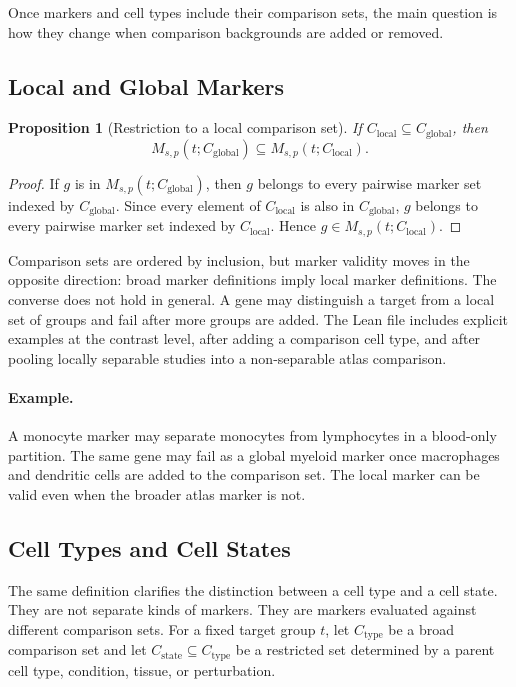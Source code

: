 \documentclass{article}
\newtheorem{proposition}{Proposition}
\begin{document}
Once markers and cell types include their comparison sets, the main question is how they change when comparison backgrounds are added or removed.

\subsection{Local and Global Markers}

\begin{proposition}[Restriction to a local comparison set]\label{prop:comparison-family-monotonicity}
If $C_{\mathrm{local}}\subseteq C_{\mathrm{global}}$, then
\[
  M_{s,p}(t;C_{\mathrm{global}})
  \subseteq
  M_{s,p}(t;C_{\mathrm{local}}).
\]
\end{proposition}

\begin{proof}
If $g$ is in $M_{s,p}(t;C_{\mathrm{global}})$, then $g$ belongs to every pairwise marker set indexed by $C_{\mathrm{global}}$. Since every element of $C_{\mathrm{local}}$ is also in $C_{\mathrm{global}}$, $g$ belongs to every pairwise marker set indexed by $C_{\mathrm{local}}$. Hence $g\in M_{s,p}(t;C_{\mathrm{local}})$.
\end{proof}

Comparison sets are ordered by inclusion, but marker validity moves in the opposite direction: broad marker definitions imply local marker definitions. The converse does not hold in general. A gene may distinguish a target from a local set of groups and fail after more groups are added. The Lean file includes explicit examples at the contrast level, after adding a comparison cell type, and after pooling locally separable studies into a non-separable atlas comparison.

\paragraph{Example.}
A monocyte marker may separate monocytes from lymphocytes in a blood-only partition. The same gene may fail as a global myeloid marker once macrophages and dendritic cells are added to the comparison set. The local marker can be valid even when the broader atlas marker is not.

\subsection{Cell Types and Cell States}

The same definition clarifies the distinction between a cell type and a cell state. They are not separate kinds of markers. They are markers evaluated against different comparison sets. For a fixed target group $t$, let $C_{\mathrm{type}}$ be a broad comparison set and let $C_{\mathrm{state}}\subseteq C_{\mathrm{type}}$ be a restricted set determined by a parent cell type, condition, tissue, or perturbation.
\end{document}
